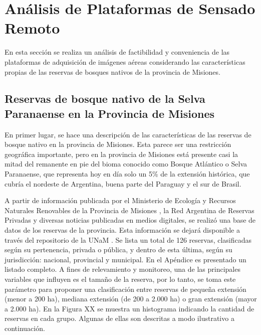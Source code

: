 \section{Análisis de Plataformas de Sensado Remoto}
En esta sección se realiza un análisis de factibilidad y conveniencia de las plataformas de adquisición de imágenes aéreas considerando las características propias de las reservas de bosques nativos de la provincia de Misiones.\\

\subsection{Reservas de bosque nativo de la Selva Paranaense en la Provincia de Misiones}
En primer lugar, se hace una descripción de las características de las reservas de bosque nativo en la provincia de Misiones. Esta parece ser una restricción geográfica importante, pero en la provincia de Misiones está presente casi la mitad del remanente en pie del bioma conocido como Bosque Atlántico o Selva Paranaense, que representa hoy en día solo un 5\% de la extensión histórica, que cubría el nordeste de Argentina, buena parte del Paraguay y el sur de Brasil. 

A partir de información publicada por el Ministerio de Ecología y Recursos Naturales Renovables de la Provincia de Misiones \cite{noauthor_areas_nodate}, la Red Argentina de Reservas Privadas \cite{noauthor_red_nodate} y diversas noticias publicadas en medios digitales, se realizó una base de datos de los reservas de la provincia. Esta información se dejará disponible a través del repositorio de la UNaM \cite{noauthor_principal_nodate}.
Se lista un total de 126 reservas, clasificadas según  su pertenencia, privada o pública, y dentro de esta última, según su jurisdicción: nacional, provincial y municipal. En el Apéndice es presentado un listado completo.
A fines de relevamiento y monitoreo, una de las principales variables que influyen es el tamaño de la reserva, por lo tanto, se toma este parámetro para proponer una clasificación entre reservas de pequeña extensión (menor a 200 ha), mediana extensión (de 200 a 2.000 ha) o gran extensión (mayor a 2.000 ha). En la Figura XX se muestra un histograma indicando la cantidad de reservas en cada grupo. 
Algunas de ellas son descritas a modo ilustrativo a continuación.

